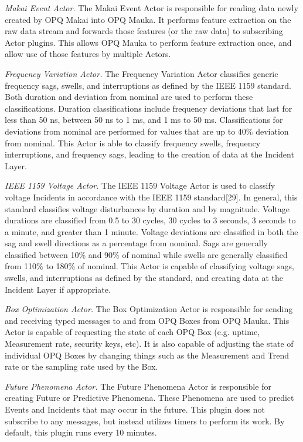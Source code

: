 {\em Makai Event Actor.} The Makai Event Actor is responsible for reading data newly created by OPQ Makai into OPQ Mauka. It performs feature extraction on the raw data stream and forwards those features (or the raw data) to subscribing Actor plugins. This allows OPQ Mauka to perform feature extraction once, and allow use of those features by multiple Actors.

{\em Frequency Variation Actor.} The Frequency Variation Actor classifies generic frequency sags, swells, and interruptions as defined by the IEEE 1159 standard. Both duration and deviation from nominal are used to perform these classifications. Duration classifications include frequency deviations that last for less than 50 ns, between 50 ns to 1 ms, and 1 ms to 50 ms. Classifications for deviations from nominal are performed for values that are up to 40\% deviation from nominal. This Actor is able to classify frequency swells, frequency interruptions, and frequency sags, leading to the creation of data at the Incident Layer.

{\em IEEE 1159 Voltage Actor.} The IEEE 1159 Voltage Actor is used to classify voltage Incidents in accordance with the IEEE 1159 standard[29]. In general, this standard classifies voltage disturbances by duration and by magnitude. Voltage durations are classified from 0.5 to 30 cycles, 30 cycles to 3 seconds, 3 seconds to a minute, and greater than 1 minute. Voltage deviations are classified in both the sag and swell directions as a percentage from nominal. Sags are generally classified between 10\% and 90\% of nominal while swells are generally classified from 110\% to 180\% of nominal. This Actor is capable of classifying voltage sags, swells, and interruptions as defined by the standard, and creating data at the Incident Layer if appropriate.

{\em Box Optimization Actor.} The Box Optimization Actor is responsible for sending and receiving typed messages to and from OPQ Boxes from OPQ Mauka. This Actor is capable of requesting the state of each OPQ Box (e.g. uptime, Measurement rate, security keys, etc). It is also capable of adjusting the state of individual OPQ Boxes by changing things such as the Measurement and Trend rate or the sampling rate used by the Box.

{\em Future Phenomena Actor.} The Future Phenomena Actor is responsible for creating Future or Predictive Phenomena. These Phenomena are used to predict Events and Incidents that may occur in the future. This plugin does not subscribe to any messages, but instead utilizes timers to perform its work. By default, this plugin runs every 10 minutes.

